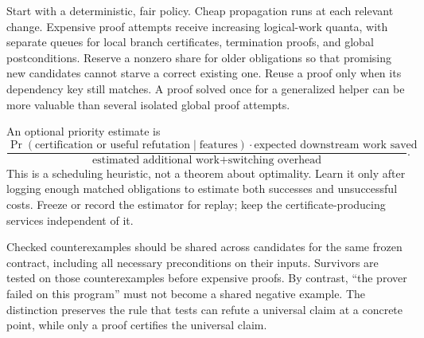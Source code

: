 Start with a deterministic, fair policy. Cheap propagation runs at each relevant change. Expensive proof attempts receive increasing logical-work quanta, with separate queues for local branch certificates, termination proofs, and global postconditions. Reserve a nonzero share for older obligations so that promising new candidates cannot starve a correct existing one. Reuse a proof only when its dependency key still matches. A proof solved once for a generalized helper can be more valuable than several isolated global proof attempts.

An optional priority estimate is
\[
 \frac{\Pr(\text{certification or useful refutation}\mid\text{features})
       \cdot\text{expected downstream work saved}}
      {\text{estimated additional work}+\text{switching overhead}}.
\]
This is a scheduling heuristic, not a theorem about optimality. Learn it only after logging enough matched obligations to estimate both successes and unsuccessful costs. Freeze or record the estimator for replay; keep the certificate-producing services independent of it.

Checked counterexamples should be shared across candidates for the same frozen contract, including all necessary preconditions on their inputs. Survivors are tested on those counterexamples before expensive proofs. By contrast, ``the prover failed on this program'' must not become a shared negative example. The distinction preserves the rule that tests can refute a universal claim at a concrete point, while only a proof certifies the universal claim.
